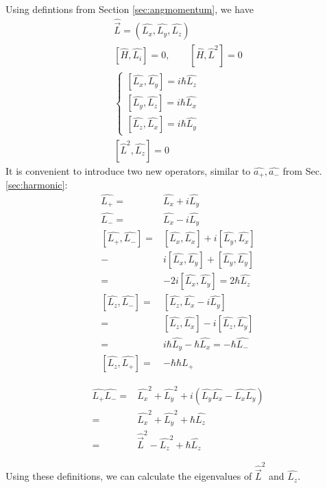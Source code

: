 		Using defintions from Section \ref{sec:angmomentum}, we have
		\begin{align}
			\hat{\vec{L}} = \left(\hat{L_x}, \hat{L_y}, \hat{L_z}\right) \\
			\left[\hat{H}, \hat{L_i}\right] = 0, \qquad \left[\hat{H}, \hat{L}^2\right] = 0 \\
			\left\{ \begin{aligned}
				\left[\hat{L_x}, \hat{L_y}\right] = i\hbar\hat{L_z} \\
				\left[\hat{L_y}, \hat{L_z}\right] = i\hbar\hat{L_x} \\
				\left[\hat{L_z}, \hat{L_x}\right] = i\hbar\hat{L_y}
			\end{aligned} \right. \\			
			\left[\hat{L}^2, \hat{L_z}\right] = 0
		\end{align}
		It is convenient to introduce two new operators, similar to $\hat{a_+}, \hat{a_-}$ from Sec.\ref{sec:harmonic}:
		\begin{align}
			\hat{L_+} =& \hat{L_x} + i\hat{L_y} \\
			\hat{L_-} =& \hat{L_x} - i\hat{L_y}	\\
			\left[\hat{L_+}, \hat{L_-}\right] =& \left[\hat{L_x}, \hat{L_x}\right] + i\left[\hat{L_y}, \hat{L_x}\right] \\
			-& i\left[\hat{L_x}, \hat{L_y}\right] + \left[\hat{L_y}, \hat{L_y}\right] \\
			=& -2i\left[\hat{L_x}, \hat{L_y}\right] = 2\hbar\hat{L_z} \\
			\left[\hat{L_z}, \hat{L_-}\right] =& \left[\hat{L_z}, \hat{L_x} -i\hat{L_y}\right]\\
			=& \left[\hat{L_z}, \hat{L_x}\right] - i\left[\hat{L_z}, \hat{L_y}\right]\\
			=& i\hbar\hat{L_y} -\hbar\hat{L_x} = -\hbar\hat{L_-} \\
			\left[\hat{L_z}, \hat{L_+}\right] =& -\hbar\hbar{L_+}
		\end{align}
		
		\begin{align}
			\hat{L_+}\hat{L_-} =& \hat{L_x}^2 + \hat{L_y}^2 + i\left(\hat{L_y}\hat{L_x} - \hat{L_x}\hat{L_y}\right) \\
			=& \hat{L_x}^2 + \hat{L_y}^2 + \hbar\hat{L_z} \\
			=& \hat{\vec{L}}^2 - \hat{L_z}^2 + \hbar\hat{L_z}
		\end{align}
		
		Using these definitions, we can calculate the eigenvalues of $\hat{\vec{L}}^2$ and $\hat{L_z}$.
		
